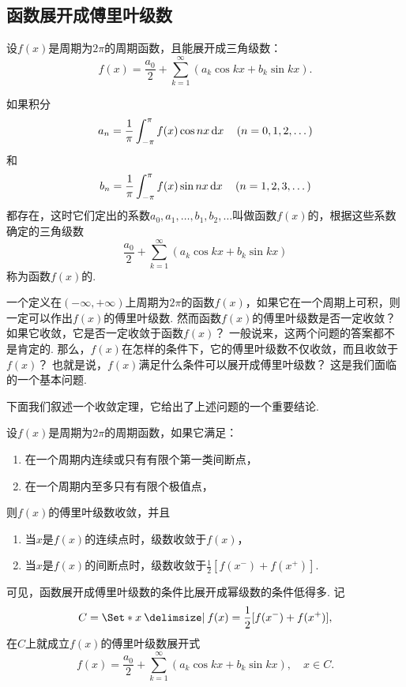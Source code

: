 \subsection{函数展开成傅里叶级数}
\begin{definition}
设\(f(x)\)是周期为\(2 \pi\)的周期函数，且能展开成三角级数：\[
f(x) = \frac{a_0}{2} + \sum\limits_{k=1}^{\infty}(a_k \cos{kx} + b_k \sin kx).
\]

如果积分\[
a_n = \frac{1}{\pi} \int_{-\pi}^{\pi} f(x) \cos nx \dd{x} \quad(n=0,1,2,\dotsc)
\]和\[
b_n = \frac{1}{\pi} \int_{-\pi}^{\pi} f(x) \sin nx \dd{x} \quad(n=1,2,3,\dotsc)
\]都存在，这时它们定出的系数\(a_0,a_1,\dotsc,b_1,b_2,\dotsc\)叫做函数\(f(x)\)的，根据这些系数确定的三角级数\[
\frac{a_0}{2} + \sum\limits_{k=1}^{\infty}(a_k \cos{kx} + b_k \sin kx)
\]称为函数\(f(x)\)的.
\end{definition}

一个定义在\((-\infty,+\infty)\)上周期为\(2\pi\)的函数\(f(x)\)，如果它在一个周期上可积，则一定可以作出\(f(x)\)的傅里叶级数.
然而函数\(f(x)\)的傅里叶级数是否一定收敛？
如果它收敛，它是否一定收敛于函数\(f(x)\)？
一般说来，这两个问题的答案都不是肯定的.
那么，\(f(x)\)在怎样的条件下，它的傅里叶级数不仅收敛，而且收敛于\(f(x)\)？
也就是说，\(f(x)\)满足什么条件可以展开成傅里叶级数？
这是我们面临的一个基本问题.

下面我们叙述一个收敛定理，它给出了上述问题的一个重要结论.
\begin{theorem}\label{theorem:无穷级数.傅里叶级数收敛的狄利克雷充分条件}
设\(f(x)\)是周期为\(2 \pi\)的周期函数，如果它满足：
\begin{enumerate}
\item 在一个周期内连续或只有有限个第一类间断点，%
\item 在一个周期内至多只有有限个极值点，%
\end{enumerate}
则\(f(x)\)的傅里叶级数收敛，并且
\begin{enumerate}
\item 当\(x\)是\(f(x)\)的连续点时，级数收敛于\(f(x)\)，%
\item 当\(x\)是\(f(x)\)的间断点时，级数收敛于\(\frac{1}{2} [ f(x^-) + f(x^+) ]\).
\end{enumerate}
\end{theorem}

可见，函数展开成傅里叶级数的条件比展开成幂级数的条件低得多.
记\[
C = \Set*{ x \given f(x) = \frac{1}{2} [ f(x^-) + f(x^+) ] },
\]在\(C\)上就成立\(f(x)\)的傅里叶级数展开式\[
f(x) = \frac{a_0}{2} + \sum\limits_{k=1}^{\infty}(a_k \cos{kx} + b_k \sin kx),
\quad x \in C.
\]

